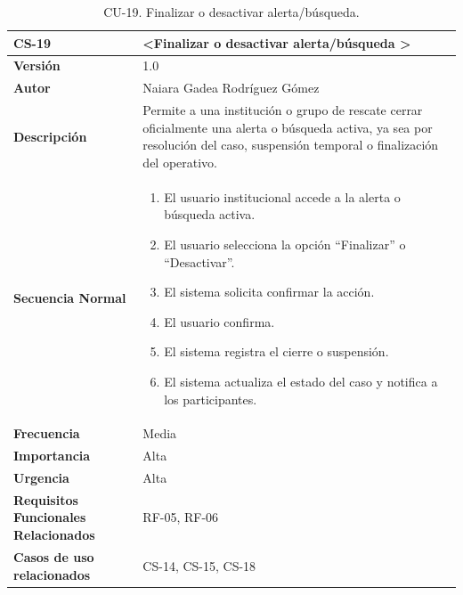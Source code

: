 \begin{table}[htbp] %
\centering
\begin{tabular}{ |m{3cm}|m{11cm}|  } 
\hline
\cellcolor[HTML]{B9E3F0}\centering\textbf{CS-19} & \cellcolor[HTML]{B9E3F0}\textbf{\textless Finalizar o desactivar alerta/búsqueda \textgreater}\\

\hline
\cellcolor[HTML]{EFEFEF}\textbf{Versión}             & 1.0  \\
\hline
\cellcolor[HTML]{EFEFEF}\textbf{Autor}                & Naiara Gadea Rodríguez Gómez\\
\hline
\cellcolor[HTML]{EFEFEF}\textbf{Descripción}                & {Permite a una institución o grupo de rescate cerrar oficialmente una alerta o búsqueda activa, ya sea por resolución del caso, suspensión temporal o finalización del operativo.}\\
\hline
\cellcolor[HTML]{EFEFEF}\textbf{Secuencia \newline Normal}                &                 
        \begin{enumerate}
			\item El usuario institucional accede a la alerta o búsqueda activa.
			\item El usuario selecciona la opción “Finalizar” o “Desactivar”.
			\item El sistema solicita confirmar la acción.
			\item El usuario confirma.
			\item El sistema registra el cierre o suspensión.
			\item El sistema actualiza el estado del caso y notifica a los participantes.
		\end{enumerate}\\
\hline
\cellcolor[HTML]{EFEFEF}\textbf{Frecuencia}                & Media\\
\hline
\cellcolor[HTML]{EFEFEF}\textbf{Importancia}                & Alta\\
\hline
\cellcolor[HTML]{EFEFEF}\textbf{Urgencia}                & Alta\\
\hline
\cellcolor[HTML]{EFEFEF}\textbf{Requisitos Funcionales Relacionados}                & {RF-05, RF-06}\\
\hline
\cellcolor[HTML]{EFEFEF}\textbf{Casos de uso relacionados}                & {CS-14, CS-15, CS-18}\\
\hline
\end{tabular}
\caption{CU-19. Finalizar o desactivar alerta/búsqueda.}
\end{table}

